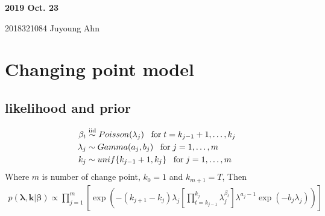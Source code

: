 \documentclass[11pt]{article}
\begin{document}
	
	
	
	\newcommand{\Ito}{$It\hat{o}$'$s~Lemma$}
	
	\newcommand\ind{\stackrel{\rm ind}{\sim}}
	\newcommand\iid{\stackrel{\rm iid}{\sim}}
	\renewcommand\c{\mathbf{c}}
	\newcommand\y{\mathbf{y}}
	\newcommand\z{\mathbf{z}}
	\renewcommand\P{\mathbf{P}}
	\newcommand\W{\mathbf{W}}
	\newcommand\X{\mathbf{X}}
	\newcommand\Y{\mathbf{Y}}
	\newcommand\Z{\mathbf{Z}}
	\newcommand\J{{\cal J}}
	\newcommand\B{{\cal B}}
	\newcommand\K{{\cal K}}
	\newcommand\N{{\rm N}}
	\newcommand\bs{\boldsymbol}
	\newcommand\bth{\bs\theta}
	\newcommand\bbe{\bs\beta}
	\renewcommand\*{^\star}
	\newcommand{\notimplies}{%
		\mathrel{{\ooalign{\hidewidth$\not\phantom{=}$\hidewidth\cr$\implies$}}}}
	
	\def\spacingset#1{\renewcommand{\baselinestretch}%
		{#1}\small\normalsize} \spacingset{1}
	
	
	
	\bigskip
	\bigskip
	\bigskip
	\begin{center}
		{\LARGE\bf 2019 Oct. 23 }
	\end{center}
	\begin{center}
		2018321084 Juyoung Ahn
	\end{center}
	\medskip
	
	
	
	\spacingset{1.45}
	\section{Changing point model}
	\subsection{likelihood and prior}
	\begin{align*}
	\beta_t &\iid 
	 Poisson(\lambda_j)\;\;\; \text{for}\; t=k_{j-1} + 1, \dots ,k_j \\
	\lambda_j &\sim Gamma(a_j,b_j) \;\;\;\text{for}\;j =  1, \dots, m \\
	k_j &\sim unif\{k_{j-1} + 1, k_j\} \;\;\;\text{for}\;j =  1, \dots, m 
	\end{align*}
	Where $m$ is number of change point, $k_0 = 1$ and $k_{m+1} = T$, Then
	\begin{align*}
	p(\boldsymbol{\lambda},\boldsymbol{k}|\boldsymbol{\beta}) \propto \prod_{j=1}^{m} \left[ \exp\left(-(k_{j+1}-k_j)\lambda_j \left[\prod_{t= k_{j-1}}^{k_j}  \lambda_j^{\beta_t}\right] \lambda^{a_j-1} \exp(-b_j\lambda_j)\right)\right]
	\end{align*}
\end{document}
